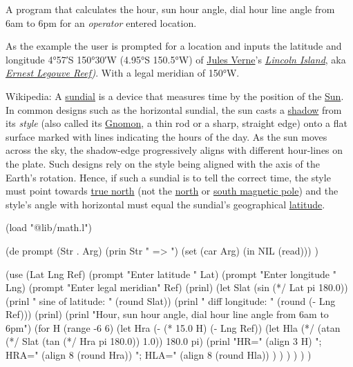 \begin{itemize}
A program that calculates the hour, sun hour angle, dial hour line angle
from 6am to 6pm for an \emph{operator} entered location.

As the example the user is prompted for a location and inputs the
latitude and longitude 4°57′S 150°30′W (4.95°S 150.5°W) of
\href{http://en.wikipedia.org/wiki/Jules\_Verne}{Jules Verne}'s
\emph{\href{http://en.wikipedia.org/wiki/The\_Mysterious\_Island}{Lincoln
Island}}, aka
\emph{\href{http://en.wikipedia.org/wiki/Ernest\_Legouve\_Reef}{Ernest
Legouve Reef})}. With a legal meridian of 150°W.

Wikipedia: A \href{http://en.wikipedia.org/wiki/sundial}{sundial} is a
device that measures time by the position of the
\href{http://en.wikipedia.org/wiki/Sun}{Sun}. In common designs such as
the horizontal sundial, the sun casts a
\href{http://en.wikipedia.org/wiki/shadow}{shadow} from its \emph{style}
(also called its \href{http://en.wikipedia.org/wiki/Gnomon}{Gnomon}, a
thin rod or a sharp, straight edge) onto a flat surface marked with
lines indicating the hours of the day. As the sun moves across the sky,
the shadow-edge progressively aligns with different hour-lines on the
plate. Such designs rely on the style being aligned with the axis of the
Earth's rotation. Hence, if such a sundial is to tell the correct time,
the style must point towards
\href{http://en.wikipedia.org/wiki/true\_north}{true north} (not the
\href{http://en.wikipedia.org/wiki/North\_Magnetic\_Pole}{north} or
\href{http://en.wikipedia.org/wiki/Magnetic\_South\_Pole}{south magnetic
pole}) and the style's angle with horizontal must equal the sundial's
geographical \href{http://en.wikipedia.org/wiki/latitude}{latitude}.

\begin{wideverbatim}

(load "@lib/math.l")

(de prompt (Str . Arg)
   (prin Str " => ")
   (set (car Arg) (in NIL (read))) )

(use (Lat Lng Ref)
   (prompt "Enter latitude      " Lat)
   (prompt "Enter longitude     " Lng)
   (prompt "Enter legal meridian" Ref)
   (prinl)
   (let Slat (sin (*/ Lat pi 180.0))
      (prinl "    sine of latitude:   " (round Slat))
      (prinl "    diff longitude:     " (round (- Lng Ref)))
      (prinl)
      (prinl "Hour, sun hour angle, dial hour line angle from 6am to 6pm")
      (for H (range -6 6)
         (let Hra (- (* 15.0 H) (- Lng Ref))
            (let Hla (*/ (atan (*/ Slat (tan (*/ Hra pi 180.0)) 1.0)) 180.0 pi)
               (prinl
                  "HR="
                  (align 3 H)
                  "; HRA="
                  (align 8 (round Hra))
                  "; HLA="
                  (align 8 (round Hla)) ) ) ) ) ) )


\end{wideverbatim}
\end{itemize}
